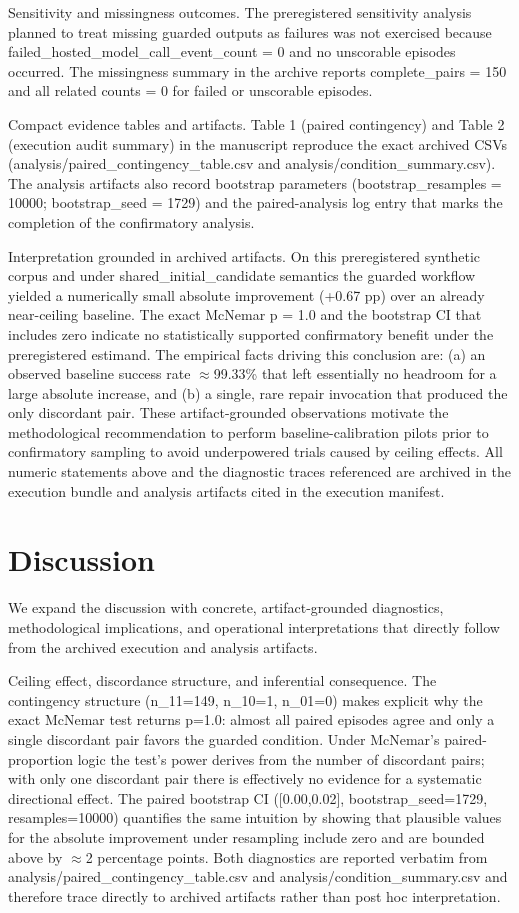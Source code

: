 \documentclass[conference]{IEEEtran}
\begin{document}
Sensitivity and missingness outcomes. The preregistered sensitivity analysis planned to treat missing guarded outputs as failures was not exercised because failed\_hosted\_model\_call\_event\_count = 0 and no unscorable episodes occurred. The missingness summary in the archive reports complete\_pairs = 150 and all related counts = 0 for failed or unscorable episodes.

Compact evidence tables and artifacts. Table 1 (paired contingency) and Table 2 (execution audit summary) in the manuscript reproduce the exact archived CSVs (analysis/paired\_contingency\_table.csv and analysis/condition\_summary.csv). The analysis artifacts also record bootstrap parameters (bootstrap\_resamples = 10000; bootstrap\_seed = 1729) and the paired-analysis log entry that marks the completion of the confirmatory analysis.

Interpretation grounded in archived artifacts. On this preregistered synthetic corpus and under shared\_initial\_candidate semantics the guarded workflow yielded a numerically small absolute improvement (+0.67 pp) over an already near-ceiling baseline. The exact McNemar p = 1.0 and the bootstrap CI that includes zero indicate no statistically supported confirmatory benefit under the preregistered estimand. The empirical facts driving this conclusion are: (a) an observed baseline success rate \ensuremath{\approx}99.33\% that left essentially no headroom for a large absolute increase, and (b) a single, rare repair invocation that produced the only discordant pair. These artifact-grounded observations motivate the methodological recommendation to perform baseline-calibration pilots prior to confirmatory sampling to avoid underpowered trials caused by ceiling effects. All numeric statements above and the diagnostic traces referenced are archived in the execution bundle and analysis artifacts cited in the execution manifest.

\section{Discussion}
We expand the discussion with concrete, artifact-grounded diagnostics, methodological implications, and operational interpretations that directly follow from the archived execution and analysis artifacts.

Ceiling effect, discordance structure, and inferential consequence. The contingency structure (n\_11=149, n\_10=1, n\_01=0) makes explicit why the exact McNemar test returns p=1.0: almost all paired episodes agree and only a single discordant pair favors the guarded condition. Under McNemar's paired-proportion logic the test's power derives from the number of discordant pairs; with only one discordant pair there is effectively no evidence for a systematic directional effect. The paired bootstrap CI ([0.00,0.02], bootstrap\_seed=1729, resamples=10000) quantifies the same intuition by showing that plausible values for the absolute improvement under resampling include zero and are bounded above by \ensuremath{\approx}2 percentage points. Both diagnostics are reported verbatim from analysis/paired\_contingency\_table.csv and analysis/condition\_summary.csv and therefore trace directly to archived artifacts rather than post hoc interpretation.
\end{document}

